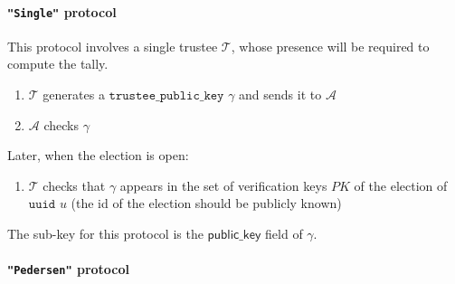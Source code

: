 \documentclass[a4paper]{article}
\newcommand{\uuid}{\texttt{uuid}}
\newcommand{\tpk}{\texttt{trustee\_public\_key}}
\begin{document}
\paragraph{\texttt{"Single"} protocol}

This protocol involves a single trustee $\mathcal{T}$, whose presence
will be required to compute the tally.
\begin{enumerate}
\item $\mathcal{T}$ generates a \hyperref[trustee-keys]{$\tpk$}
  $\gamma$ and sends it to $\mathcal{A}$
\item $\mathcal{A}$ checks $\gamma$
\end{enumerate}
Later, when the election is open:
\begin{enumerate}
\item $\mathcal{T}$ checks that $\gamma$ appears in the set of verification
  keys $PK$ of the election of {$\uuid$} $u$ (the id of the election
  should be publicly known)
\end{enumerate}
The sub-key for this protocol is the $\textsf{public\_key}$ field of
$\gamma$.

\paragraph{\texttt{"Pedersen"} protocol}
\end{document}
